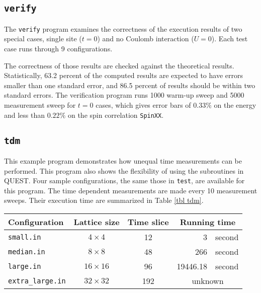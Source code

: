 \documentclass[12pt]{article}
\begin{document}
\subsection{\tt verify}
The \verb|verify| program examines the correctness of the execution results of two special cases, single site ($t=0$) and no Coulomb interaction ($U=0$).
Each test case runs through 9 configurations.
		
The correctness of those results are checked against the theoretical results. Statistically, 63.2 percent of the computed results are expected to have errors smaller than one standard error, and 86.5 percent of results should be within two standard errors. The verification program runs 1000 warm-up sweep and 5000 measurement sweep for $t=0$ cases, which gives error bars of $0.33\%$ on the energy and less than $0.22\%$ on the spin correlation \verb|SpinXX|.


\subsection{\tt tdm}
This example program demonstrates how unequal time measurements can be performed.  This program also shows the flexibility of using the subroutines in QUEST.  Four sample configurations, the same those in \verb|test|, are available for this program.
The time dependent measurements are made every 10 measurement sweeps.
Their execution time are summarized in Table \ref{tbl tdm}.

	\begin{center}
	\begin{tabular}{|l|c|c|rl|}
	\hline
	Configuration   &  Lattice size & Time slice& \multicolumn{2}{|c|}{Running time}\\
	\hline
	\verb|small.in|  & $4\times 4$ & 12 & 3 & second\\
	\verb|median.in|  & $8\times 8$ & 48 & 266 & second\\
	\verb|large.in|  & $16\times 16$ & 96 & 19446.18 & second\\
	\verb|extra_large.in|  & $32\times 32$ & 192 & \multicolumn{2}{|c|}{unknown}\\
	\hline	
	 \end{tabular}
   \label{tbl tdm}
	\end{center}
\end{document}
